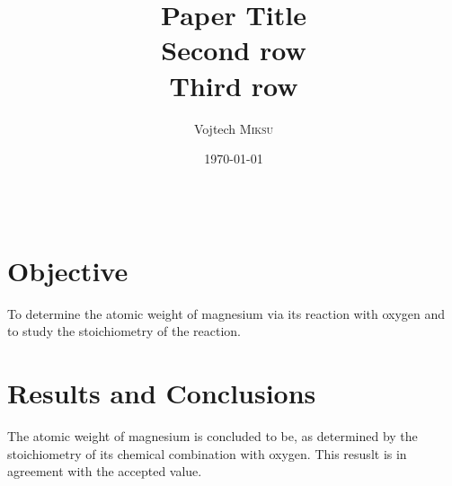 \documentclass{article}
\title{Paper Title \\ Second row \\ Third row} %
\author{Vojtech \textsc{Miksu}} %
\date{\today} %
\begin{document}
\maketitle %

\begin{center}
\begin{tabular}{l r}
\end{tabular}
\end{center}


\section{Objective}

To determine the atomic weight of magnesium via its reaction with oxygen and to study the stoichiometry of the reaction. \cite{marsland}



\section{Results and Conclusions}

The atomic weight of magnesium is concluded to be, as determined by the stoichiometry of its chemical combination with oxygen. This resuslt is in agreement with the accepted value. \cite{deepface}




\end{document}

